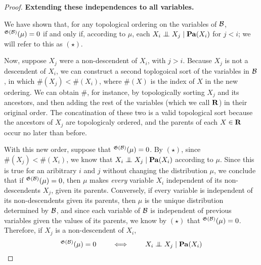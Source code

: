 \documentclass{article}
\theoremstyle{plain}
\theoremstyle{definition}
\theoremstyle{remark}
\let\H\relax
\DeclareMathOperator{\H}{\mathrm{H}} %
\newcommand{\CI}{\mathrel{\perp\mspace{-10mu}\perp}} %
\newcommand{\dg}[1]{\mathfrak{#1}}
\newcommand\Pa{\mathbf{Pa}}
\newcommand{\PDGof}[1]{\dg G(#1)}
\numberwithin{equation}{section}
\begin{document}
\begin{proof}
		\textbf{Extending these independences to all variables.}
		
		We have shown that, for any topological ordering on the variables of $\cal B$, $\H^{\PDGof{\cal B}}(\mu) = 0$ if and only if, according to $\mu$,  each $X_i \CI X_j \mid \Pa(X_i)$ for $j  < i$; we will refer to this as $(\star)$.
		
		Now, suppose $X_j$ were a non-descendent of $X_i$, with $j > i$. Because $X_j$ is not a descendent of $X_i$, we can construct a second toplogoical sort of the variables in $\cal B$, in which $\#(X_j) < \#(X_i)$, where $\#(X)$ is the index of $X$ in the new ordering. 
		We can obtain $\#$, for instance, by topologically sorting $X_j$ and its ancestors, and then adding the rest of the variables (which we call $\bf R$) in their original order. The concatination of these two is a valid topological sort because the ancestors of $X_j$ are topologicaly ordered, and the parents of each $X \in \bf R$ occur no later than before.
		
		
		With this new order, suppose that $\H^{\PDGof{\cal B}}(\mu) = 0$. By $(\star)$, since $\#(X_j) < \#(X_i)$, we know that $X_i \CI X_j \mid \Pa(X_i)$ according to $\mu$. Since this is true for an aribitrary $i$ and $j$ without changing the distribution $\mu$, we conclude that if $\H^{\PDGof{\cal B}}(\mu) = 0$, then $\mu$ makes \emph{every} variable $X_i$ independent of its non-descendents $X_j$, given its parents.
		Conversely, if every variable is independent of its non-descendents given its parents, then $\mu$ is the unique distribution determined by $\cal B$, and since each variable of $\cal B$ is independent of previous variables given the values of its parents,  we know by $(\star)$ that $\H^{\PDGof{\cal B}}(\mu) = 0$. Therefore, if $X_j$ is a non-descendent of $X_i$, 
		\[ \H^{\PDGof{\cal B}}(\mu) = 0 \qquad\iff\qquad X_i \CI X_j \mid \Pa(X_i) \] 
		

\end{proof}
\end{document}
